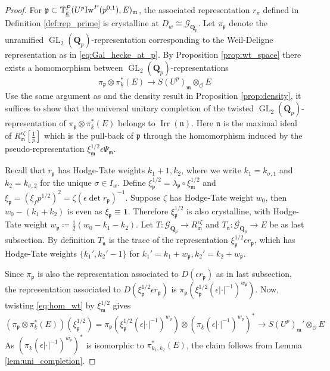 \documentclass[leqno]{amsart}
\newcommand{\wt}[1]{\underline{ #1 }}
\newcommand{\TT}{\mathbb{T}} %
\newcommand{\Iw}{\textnormal{Iw}}
\newcommand{\Gp}{\mathcal{G}_{\Qp}} %
\DeclareMathOperator{\Irr}{Irr}
\DeclareMathOperator{\GL}{GL}
\newcommand{\id}{\mathbf{1}}
\newcommand{\Qp}{\mathbf{Q}_p}
\newcommand{\E}{E} %
\newcommand{\oo}{\mathcal{O}} %
\newcommand{\fm}{\mathfrak{m}}
\newcommand{\fn}{\mathfrak{n}}
\newcommand{\fp}{\mathfrak{p}}
\theoremstyle{definition}
\theoremstyle{remark}
\begin{document}
\begin{proof}
	For $\fp\subset \TT_{\wt{k}}^P(U^p\Iw^P(p^{0,1}),E)_{\fm}$,
	the associated representation $r_\pi$ defined 
	in Definition \ref{def:rep_prime}
	is crystalline at $D_w\cong \Gp$.
	Let $\pi_{\fp}$ denote the unramified
	$\GL_2(\Qp)$-representation 
	corresponding to the Weil-Deligne representation
	as in \eqref{eq:Gal_hecke_at_p}.
	By Proposition \ref{prop:wt_space} there exists
	a homomorphism between  $\GL_2(\Qp)$-representations
	\begin{equation}\label{eq:hom_wt}
		\pi_\fp\otimes \pi_{\wt{k}}^*(E)\to S(U^p)_\fm\otimes_{\oo}\E
	\end{equation}
	Use the same argument as \cite[Thm 3.5.5]{pan}
	and the density result in Proposition \ref{prop:density},
	it suffices to show that
	the universal unitary completion of
	the twisted $\GL_2(\Qp)$-representation
	of $\pi_{\fp}\otimes\pi_{\wt{k}}^*(E)$
	belongs to $\Irr(\fn)$.
	Here $\fn$ is the maximal ideal 
	of  $R_\fm^{\epsilon\zeta}[\frac{1}{p}]$ 
	which is the pull-back of $\fp$
	through the homomorphism induced by
	the pseudo-representation  $\xi_{\fm}^{1/2}\epsilon\Psi_\fm$.

	Recall that $r_\fp$
	has Hodge-Tate weights  $k_1+1,k_2$,
	where we write 
	$k_1=k_{\sigma,1}$ and $k_2=k_{\sigma,2}$
	for the unique $\sigma\in I_w$.
	Define $\xi_\fp^{1/2}=\lambda_\fp\circ \xi_\fm^{1/2}$
	and $\xi_\fp=(\xi_fp^{1/2})^2=\zeta(\epsilon\det r_\fp)^{-1}$.
	Suppose $\zeta$ has Hodge-Tate weight  $w_0$,
	then  $w_0-(k_1+k_2)$ is even as  $\xi_\fp\equiv \id$.
	Therefore  $\xi_{\fp}^{1/2}$
	is also crystalline,
	with Hodge-Tate weight $w_{\fp}\coloneqq \frac{1}{2}(w_0-k_1-k_2)$.
	Let $T\colon \Gp\to R_\fm^{\epsilon\zeta}$ 
	and $T_\fn\colon \Gp\to E$ be as last subsection.
	By definition  $T_\fn$ is the trace of the
	representation
	$\xi_{\fp}^{1/2}\epsilon r_{\fp}$,
	which has Hodge-Tate weights  $\{k_1',k_2'-1\}$ 
	for $k_1'=k_1+w_\fp, k_2'=k_2+w_\fp$.

	Since $\pi_\fp$ is also 
	the representation associated to  
	$D(\epsilon r_\fp)$ as in last subsection,
	the representation
	associated to  $D(\xi_\fp^{1/2}\epsilon r_\fp)$ is
	$\pi_\fp(\xi_\fp^{1/2}(\epsilon|\cdot|^{-1})^{w_\fp})$.
	Now, 
	twisting \eqref{eq:hom_wt} by $\xi_\fm^{1/2}$ gives
	\[
		(\pi_{\fp}\otimes \pi_{\wt{k}}^*(E))(\xi_\fp^{1/2})=
		\pi_\fp(\xi_\fp^{1/2}(\epsilon|\cdot|^{-1})^{w_\fp})
		\otimes (\pi_{\wt{k}}(\epsilon|\cdot|^{-1})^{w_{\fp}})^* \to 
		S(U^p)_\fm'\otimes_{\oo}E
	\]
	As $(\pi_{\wt{k}}(\epsilon|\cdot|^{-1})^{w_{\fp}})^*$
	is isomorphic to $\pi_{k_1,k_2}^*(E)$,
	the claim follows from Lemma \ref{lem:uni_completion}.
\end{proof}
\end{document}
